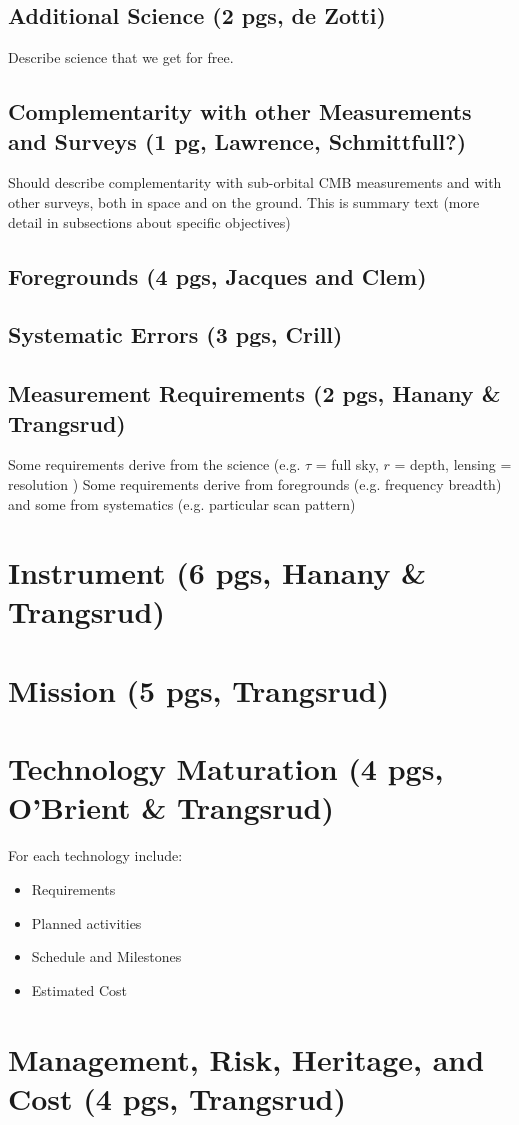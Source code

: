 \documentclass[12pt]{article}
\begin{document}
\subsection{Additional Science (2 pgs, de Zotti)} 

Describe science that we get for free. 

\subsection{Complementarity with other Measurements and Surveys (1 pg, Lawrence, Schmittfull?)} 

Should describe complementarity with sub-orbital CMB measurements and with other surveys, 
both in space and on the ground.  This is summary text (more detail in subsections about specific objectives)


\subsection{Foregrounds (4 pgs, Jacques and Clem)}


\subsection{Systematic Errors (3 pgs, Crill)}


\subsection{Measurement Requirements (2 pgs, Hanany \& Trangsrud)}

Some requirements derive from the science (e.g. $\tau$ = full sky, $r$ = depth, lensing = resolution )
Some requirements derive from foregrounds (e.g. frequency breadth) and some from systematics (e.g. particular scan pattern)


\section{Instrument (6 pgs, Hanany \& Trangsrud)}


\section{Mission (5 pgs, Trangsrud)}


\section{Technology Maturation (4 pgs, O'Brient \& Trangsrud)}


For each technology include:
\begin{itemize}
\item Requirements
\item Planned activities
\item Schedule and Milestones
\item Estimated Cost
\end{itemize}

\section{Management, Risk, Heritage, and Cost (4 pgs, Trangsrud)}


\newpage




\end{document}
